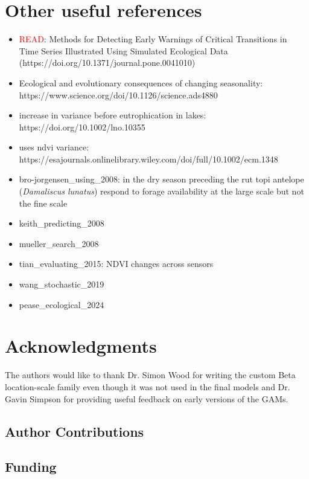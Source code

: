 \documentclass{article}
\begin{document}
\clearpage

\section{Other useful references}

\begin{itemize}
\item \textcolor{red}{READ}: Methods for Detecting Early Warnings of Critical Transitions in Time Series Illustrated Using Simulated Ecological Data (https://doi.org/10.1371/journal.pone.0041010)
\item Ecological and evolutionary consequences of changing seasonality: https://www.science.org/doi/10.1126/science.ads4880
\item increase in variance before eutrophication in lakes: https://doi.org/10.1002/lno.10355
\item uses ndvi variance: https://esajournals.onlinelibrary.wiley.com/doi/full/10.1002/ecm.1348
\item bro-jorgensen\_using\_2008: in the dry season preceding the rut topi antelope (\emph{Damaliscus lunatus}) respond to forage availability at the large scale but not the fine scale
\item keith\_predicting\_2008
\item mueller\_search\_2008
\item tian\_evaluating\_2015: NDVI changes across sensors
\item wang\_stochastic\_2019
\item pease\_ecological\_2024
\end{itemize}

\section*{Acknowledgments}

The authors would like to thank Dr. Simon Wood for writing the custom Beta location-scale family even though it was not used in the final models and Dr. Gavin Simpson for providing useful feedback on early versions of the GAMs.

\subsection*{Author Contributions}

\subsection*{Funding}
\end{document}
